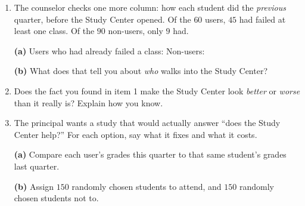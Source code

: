 \documentclass[10pt]{article}
\begin{document}
\boxguard
\begin{tcolorbox}[colback=white, colframe=black!40, breakable,
    title=\textbf{Tier E --- Extension},
    fonttitle=\bfseries, arc=2mm, left=3mm, right=3mm, top=2mm, bottom=2mm]
\small
\begin{enumerate}[leftmargin=1.6em, itemsep=5pt, topsep=3pt]

  \item The counselor checks one more column: how each student did the
        \emph{previous} quarter, before the Study Center opened. Of the $60$
        users, $45$ had failed at least one class. Of the $90$ non-users, only
        $9$ had.

        \textbf{(a)} Users who had already failed a class: \blank{2cm} \quad
        Non-users: \blank{2cm}

        \textbf{(b)} What does that tell you about \emph{who} walks into the
        Study Center?
        \writeline

  \item Does the fact you found in item 1 make the Study Center look
        \emph{better} or \emph{worse} than it really is? Explain how you know.

  \item The principal wants a study that would actually answer ``does the Study
        Center help?'' For each option, say what it fixes and what it costs.

        \textbf{(a)} Compare each user's grades this quarter to that same
        student's grades last quarter.
        \writeline

        \textbf{(b)} Assign $150$ randomly chosen students to attend, and $150$
        randomly chosen students not to.
        \writeline
\end{enumerate}
\end{tcolorbox}
\end{document}
